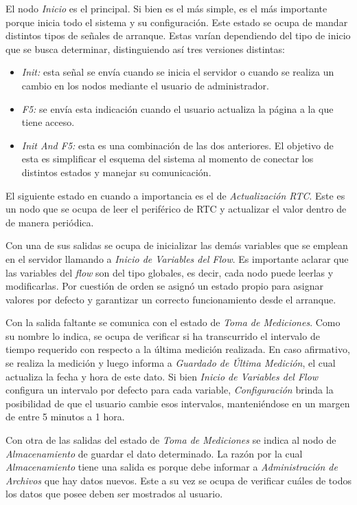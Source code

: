 
El nodo \textit{Inicio} es el principal. Si bien es el más simple, es el más importante porque inicia todo el sistema y su configuración. Este estado se ocupa de mandar distintos tipos de señales de arranque. Estas varían dependiendo del tipo de inicio que se busca determinar, distinguiendo así tres versiones distintas:
\begin{itemize}
	\item \textit{Init:} esta señal se envía cuando se inicia el servidor o cuando se realiza un cambio en los nodos mediante el usuario de administrador.
	\item \textit{F5:} se envía esta indicación cuando el usuario actualiza la página a la que tiene acceso.
	\item \textit{Init And F5:} esta es una combinación de las dos anteriores. El objetivo de esta es simplificar el esquema del sistema al momento de conectar los distintos estados y manejar su comunicación.
\end{itemize}

El siguiente estado en cuando a importancia es el de \textit{Actualización RTC}. Este es un nodo que se ocupa de leer el periférico de RTC y actualizar el valor dentro de \nodered de manera periódica.

Con una de sus salidas se ocupa de inicializar las demás variables que se emplean en el servidor llamando a \textit{Inicio de Variables del Flow}. Es importante aclarar que las variables del \textit{flow} son del tipo globales, es decir, cada nodo puede leerlas y modificarlas. Por cuestión de orden se asignó un estado propio para asignar valores por defecto y garantizar un correcto funcionamiento desde el arranque.

Con la salida faltante se comunica con el estado de \textit{Toma de Mediciones}. Como su nombre lo indica, se ocupa de verificar si ha transcurrido el intervalo de tiempo requerido con respecto a la última medición realizada. En caso afirmativo, se realiza la medición y luego informa a \textit{Guardado de Última Medición}, el cual actualiza la fecha y hora de este dato. Si bien \textit{Inicio de Variables del Flow} configura un intervalo por defecto para cada variable, \textit{Configuración} brinda la posibilidad de que el usuario cambie esos intervalos, manteniéndose en un margen de entre 5 minutos a 1 hora.

Con otra de las salidas del estado de \textit{Toma de Mediciones} se indica al nodo de \textit{Almacenamiento} de guardar el dato determinado. La razón por la cual \textit{Almacenamiento} tiene una salida es porque debe informar a \textit{Administración de Archivos} que hay datos nuevos. Este a su vez se ocupa de verificar cuáles de todos los datos que posee deben ser mostrados al usuario. 

